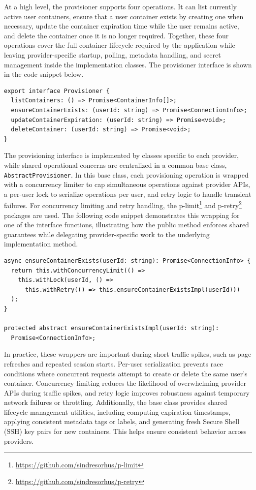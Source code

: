 At a high level, the provisioner supports four operations.
It can list currently active user containers, ensure that a user container exists by creating one when necessary, update the container expiration time while the user remains active, and delete the container once it is no longer required.
Together, these four operations cover the full container lifecycle required by the application while leaving provider-specific startup, polling, metadata handling, and secret management inside the implementation classes.
The provisioner interface is shown in the code snippet below.

\begin{verbatim}
export interface Provisioner {
  listContainers: () => Promise<ContainerInfo[]>;
  ensureContainerExists: (userId: string) => Promise<ConnectionInfo>;
  updateContainerExpiration: (userId: string) => Promise<void>;
  deleteContainer: (userId: string) => Promise<void>;
}
\end{verbatim}

The provisioning interface is implemented by classes specific to each provider, while shared operational concerns are centralized in a common base class, \texttt{AbstractProvisioner}.
In this base class, each provisioning operation is wrapped with a concurrency limiter to cap simultaneous operations against provider APIs, a per-user lock to serialize operations per user, and retry logic to handle transient failures.
For concurrency limiting and retry handling, the p-limit\footnote{\url{https://github.com/sindresorhus/p-limit}} and p-retry\footnote{\url{https://github.com/sindresorhus/p-retry}} packages are used.
The following code snippet demonstrates this wrapping for one of the interface functions, illustrating how the public method enforces shared guarantees while delegating provider-specific work to the underlying implementation method.

\begin{verbatim}
async ensureContainerExists(userId: string): Promise<ConnectionInfo> {
  return this.withConcurrencyLimit(() =>
    this.withLock(userId, () =>
      this.withRetry(() => this.ensureContainerExistsImpl(userId)))
  );
}

protected abstract ensureContainerExistsImpl(userId: string):
  Promise<ConnectionInfo>;
\end{verbatim}

In practice, these wrappers are important during short traffic spikes, such as page refreshes and repeated session starts.
Per-user serialization prevents race conditions where concurrent requests attempt to create or delete the same user's container.
Concurrency limiting reduces the likelihood of overwhelming provider APIs during traffic spikes, and retry logic improves robustness against temporary network failures or throttling.
Additionally, the base class provides shared lifecycle-management utilities, including computing expiration timestamps, applying consistent metadata tags or labels, and generating fresh Secure Shell (SSH) key pairs for new containers.
This helps ensure consistent behavior across providers.

